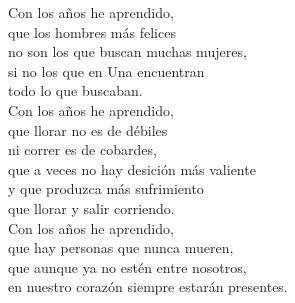 \documentclass[12pt,twocolumn,oneside]{article}
\begin{document}
Con los a\~nos he aprendido,\\
que los hombres m\'as felices\\
no son los que buscan muchas mujeres,\\
si no los que en Una encuentran\\
todo lo que buscaban.\\

Con los a\~nos he aprendido,\\
que llorar no es de d\'ebiles\\
ni correr es de cobardes,\\
que a veces no hay desici\'on m\'as valiente\\
y que produzca m\'as sufrimiento\\
que llorar y salir corriendo.\\

Con los a\~nos he aprendido,\\
que hay personas que nunca mueren,\\
que aunque ya no est\'en entre nosotros,\\
en nuestro coraz\'on siempre estar\'an presentes.
\end{document}
